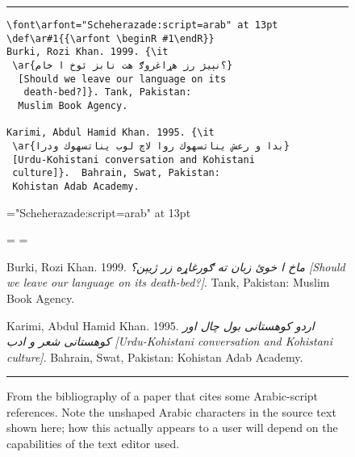 \begin{figure}[htb]
\hrule\smallskip
\begin{minipage}{0.6\hsize}
\begin{verbatim}
\font\arfont="Scheherazade:script=arab" at 13pt
\def\ar#1{{\arfont \beginR ‭#1\endR}}
Burki, Rozi Khan. 1999. {\it 
 ‭\ar{ماخ ‭ا ‭خوئ ‭زبان ‭ته ‭ګورغاړه ‭زر ‭ژيېن؟}
  [Should we leave our language on its
   death-bed?]}. Tank, Pakistan:
  Muslim Book Agency.
  
Karimi, Abdul Hamid Khan. 1995. {\it
 ‭\ar{اردو ‭كوهستانی ‭بول ‭چال ‭اور ‭كوهستانی ‭شعر ‭و ‭ادب}
 [Urdu-Kohistani conversation and Kohistani
 culture]}.  Bahrain, Swat, Pakistan: 
 Kohistan Adab Academy.
\end{verbatim}
\end{minipage}\hfil
\begin{minipage}{0.4\hsize}
\font\arfont="Scheherazade:script=arab" at 13pt
\lineskiplimit=-10pt
\def\ar#1{{\arfont\beginR#1\endR}}

\everypar={\hangindent=20pt 
 \parskip=\medskipamount}

Burki, Rozi Khan. 1999. {\it \ar{ماخ ا خوئ زبان ته ګورغاړه زر ژيېن؟} [Should we leave our language on its death-bed?]}. Tank, Pakistan: Muslim Book Agency.

Karimi, Abdul Hamid Khan. 1995. {\it \ar{اردو كوهستانی بول چال اور كوهستانی شعر و ادب} [Urdu-Kohistani conversation and Kohistani culture]}. Bahrain, Swat, Pakistan: Kohistan Adab Academy.
\end{minipage}
\smallskip\hrule
\caption{From the bibliography of a paper that cites some Arabic-script references. Note the unshaped Arabic characters in the source text shown here; how this actually appears to a user will depend on the capabilities of the text editor used.}
\end{figure}

